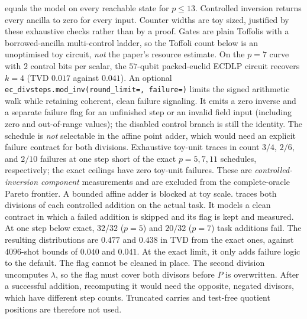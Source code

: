 \documentclass[11pt]{article}
\newcommand{\code}[1]{\texttt{#1}}
\theoremstyle{plain}
\theoremstyle{remark}
\begin{document}
equals the model on every reachable state for $p\le13$. Controlled inversion
returns every ancilla to zero for every input. Counter widths are toy sized,
justified by these exhaustive checks rather than by a proof. Gates are plain
Toffolis with a borrowed-ancilla multi-control ladder, so the Toffoli count
below is an unoptimised toy circuit, \emph{not} the paper's resource estimate.
On the $p=7$ curve with $2$ control bits per scalar, the
$57$-qubit packed-euclid ECDLP circuit recovers $k=4$
(TVD $0.017$ against $0.041$).
An optional \code{ec\_divsteps.mod\_inv(round\_limit=, failure=)} limits the
signed arithmetic walk while retaining coherent, clean failure signaling.
It emits a zero inverse and a separate failure flag for an unfinished step
or an invalid field input (including zero and out-of-range values); the
disabled control branch is still the identity. The schedule is \emph{not}
selectable in the affine point adder, which would need an explicit failure
contract for both divisions. Exhaustive toy-unit traces in
 count $3/4$, $2/6$, and $2/10$ failures at
one step short of the exact $p=5,7,11$ schedules, respectively; the exact
ceilings have zero toy-unit failures. These are \emph{controlled-inversion
component} measurements and are excluded from the complete-oracle
Pareto frontier. A bounded affine adder is blocked at toy scale.
 traces both divisions of each
controlled addition on the actual task. It models a clean contract in which a
failed addition is skipped and its flag is kept and measured. At one step
below exact, $32/32$ ($p=5$) and $20/32$ ($p=7$) task additions fail. The
resulting distributions are $0.477$ and $0.438$ in TVD from the exact ones,
against $4096$-shot bounds of $0.040$ and $0.041$. At the exact limit, it only
adds failure logic to the default. The flag cannot be cleaned in place. The
second division uncomputes $\lambda$, so the flag must cover both divisors
before $P$ is overwritten. After a successful addition, recomputing it would
need the opposite, negated divisors, which have different step counts. Truncated
carries and test-free quotient positions are therefore not used.
\end{document}
